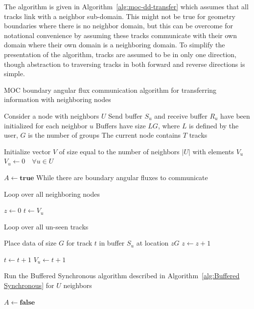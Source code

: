 The algorithm is given in Algorithm~\ref{alg:moc-dd-transfer} which assumes that all tracks link with a neighbor sub-domain. This might not be true for geometry boundaries where there is no neighbor domain, but this can be overcome for notational convenience by assuming these tracks communicate with their own domain where their own domain is a neighboring domain. To simplify the presentation of the algorithm, tracks are assumed to be in only one direction, though abstraction to traversing tracks in both forward and reverse directions is simple.

\begin{algorithm*}[!h]
	\caption{MOC boundary angular flux communication algorithm for transferring information with neighboring nodes}
	\label{alg:moc-dd-transfer}
	\begin{algorithmic}
		\State Consider a node with neighbors $U$ \hspace{\fill}
		\State Send buffer $S_u$ and receive buffer $R_u$ have been initialized for each neighbor $u$ \hspace{\fill}
		\State Buffers have size $LG$, where $L$ is defined by the user, $G$ is the number of groups
		\State The current node contains $T$ tracks %
		
		
		\State Initialize vector $V$ of size equal to the number of neighbors $|U|$ with elements $V_u$
		\State $V_u \gets 0 \quad \forall u \in U$


		\vspace{0.1in}
		\State $A \gets \textbf{true}$
		 \Comment While there are boundary angular fluxes to communicate

		\vspace{0.1in}
		 \Comment Loop over all neighboring nodes
		\vspace{0.1in}
		
		\State $z \gets 0$
		\State $t \gets V_u$
		\vspace{0.1in}
		
		  \Comment Loop over all un-seen tracks
		\vspace{0.1in}
		
		\State Place data of size $G$ for track $t$ in buffer $S_u$ at location $zG$
		\State $z \gets z+1$
		\EndIf
		
		\State $t \gets t+1$
		\State $V_u \gets t+1$
		
		\EndWhile
		\EndFor
		
		\State Run the Buffered Synchronous algorithm described in Algorithm~\ref{alg:Buffered Synchronous} for $U$ neighbors
		
		\State $A \gets \textbf{false}$
		\EndIf
		
		\EndWhile
		
	\end{algorithmic}
\end{algorithm*}

